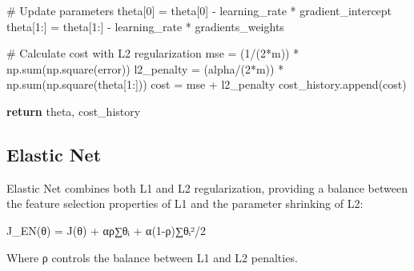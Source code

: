 \documentclass[
  letterpaper,
  DIV=11,
  numbers=noendperiod]{scrreprt}
\newenvironment{Shaded}{\begin{snugshade}}{\end{snugshade}}
\newcommand{\BuiltInTok}[1]{\textcolor[rgb]{0.00,0.23,0.31}{#1}}
\newcommand{\CommentTok}[1]{\textcolor[rgb]{0.37,0.37,0.37}{#1}}
\newcommand{\ControlFlowTok}[1]{\textcolor[rgb]{0.00,0.23,0.31}{\textbf{#1}}}
\newcommand{\DecValTok}[1]{\textcolor[rgb]{0.68,0.00,0.00}{#1}}
\newcommand{\NormalTok}[1]{\textcolor[rgb]{0.00,0.23,0.31}{#1}}
\newcommand{\OperatorTok}[1]{\textcolor[rgb]{0.37,0.37,0.37}{#1}}
\begin{document}
\begin{Shaded}
\begin{Highlighting}[]
        \CommentTok{\# Update parameters}
\NormalTok{        theta[}\DecValTok{0}\NormalTok{] }\OperatorTok{=}\NormalTok{ theta[}\DecValTok{0}\NormalTok{] }\OperatorTok{{-}}\NormalTok{ learning\_rate }\OperatorTok{*}\NormalTok{ gradient\_intercept}
\NormalTok{        theta[}\DecValTok{1}\NormalTok{:] }\OperatorTok{=}\NormalTok{ theta[}\DecValTok{1}\NormalTok{:] }\OperatorTok{{-}}\NormalTok{ learning\_rate }\OperatorTok{*}\NormalTok{ gradients\_weights}
        
        \CommentTok{\# Calculate cost with L2 regularization}
\NormalTok{        mse }\OperatorTok{=}\NormalTok{ (}\DecValTok{1}\OperatorTok{/}\NormalTok{(}\DecValTok{2}\OperatorTok{*}\NormalTok{m)) }\OperatorTok{*}\NormalTok{ np.}\BuiltInTok{sum}\NormalTok{(np.square(error))}
\NormalTok{        l2\_penalty }\OperatorTok{=}\NormalTok{ (alpha}\OperatorTok{/}\NormalTok{(}\DecValTok{2}\OperatorTok{*}\NormalTok{m)) }\OperatorTok{*}\NormalTok{ np.}\BuiltInTok{sum}\NormalTok{(np.square(theta[}\DecValTok{1}\NormalTok{:]))}
\NormalTok{        cost }\OperatorTok{=}\NormalTok{ mse }\OperatorTok{+}\NormalTok{ l2\_penalty}
\NormalTok{        cost\_history.append(cost)}
        
    \ControlFlowTok{return}\NormalTok{ theta, cost\_history}
\end{Highlighting}
\end{Shaded}

\subsection{Elastic Net}\label{elastic-net}

Elastic Net combines both L1 and L2 regularization, providing a balance
between the feature selection properties of L1 and the parameter
shrinking of L2:

J\_EN(θ) = J(θ) + αρ∑\textbar θᵢ\textbar{} + α(1-ρ)∑θᵢ²/2

Where ρ controls the balance between L1 and L2 penalties.
\end{document}
